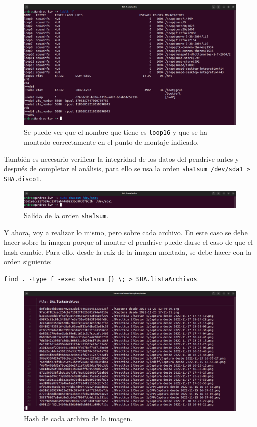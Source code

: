 \documentclass{article}
\begin{document}
\begin{figure}[H]
    \centering
    \includegraphics[width=\textwidth]{imagenes/Captura desde 2022-12-03 21-32-34.png}
    \caption{Se puede ver que el nombre que tiene es \texttt{loop16} y que se ha montado correctamente en el punto de montaje indicado.}
\end{figure}

También es necesario verificar la integridad de los datos del pendrive antes y después de completar el análisis, para ello se usa la orden \verb|sha1sum /dev/sda1 > SHA.disco1|.

\begin{figure}[H]
    \centering
    \includegraphics[width=\textwidth]{imagenes/Captura desde 2022-12-03 21-36-15.png}
    \caption{Salida de la orden \texttt{sha1sum}.}
\end{figure}

\newpage

Y ahora, voy a realizar lo mismo, pero sobre cada archivo. En este caso se debe hacer sobre la imagen porque al montar el pendrive puede darse el caso de que el hash cambie. Para ello, desde la raíz de la imagen montada, se debe hacer con la orden siguiente: 

\verb|find . -type f -exec sha1sum {} \; > SHA.listaArchivos|.

\begin{figure}[H]
    \centering
    \includegraphics[width=\textwidth]{imagenes/Captura desde 2022-12-02 18-41-07.png}
    \caption{Hash de cada archivo de la imagen.}
\end{figure}
\end{document}
